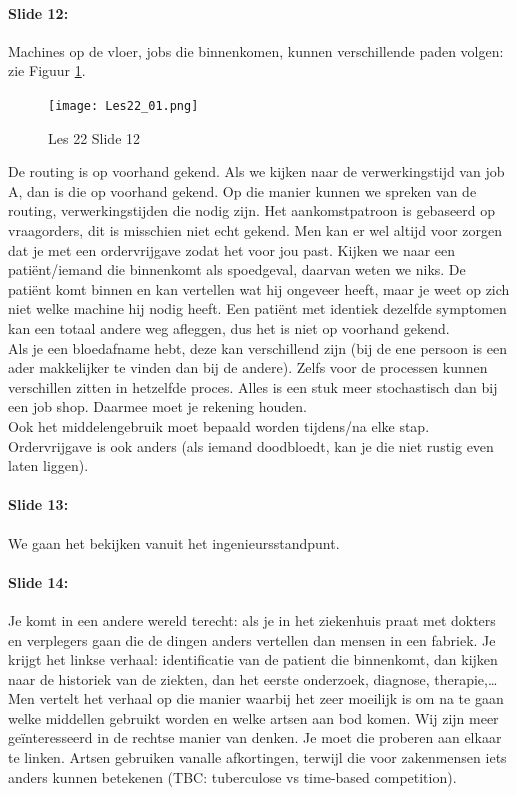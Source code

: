 \documentclass[10pt,a4paper]{report}
\begin{document}
\paragraph{Slide 12:} Machines op de vloer, jobs die binnenkomen, kunnen verschillende paden volgen: zie Figuur \ref{les22_01}.\\

\begin{figure}[h!]
\centering
\texttt{[image: Les22\_01.png]}
\caption{Les 22 Slide 12} 
\label{les22_01}
\end{figure}

De routing is op voorhand gekend. Als we kijken naar de verwerkingstijd van job A, dan is die op voorhand gekend. Op die manier kunnen we spreken van de routing, verwerkingstijden die nodig zijn. Het aankomstpatroon is gebaseerd op vraagorders, dit is misschien niet echt gekend. Men kan er wel altijd voor zorgen dat je met een ordervrijgave zodat het voor jou past. Kijken we naar een pati\"ent/iemand die binnenkomt als spoedgeval, daarvan weten we niks. De pati\"ent komt binnen en kan vertellen wat hij ongeveer heeft, maar je weet op zich niet welke machine hij nodig heeft. Een pati\"ent met identiek dezelfde symptomen kan een totaal andere weg afleggen, dus het is niet op voorhand gekend.\\
Als je een bloedafname hebt, deze kan verschillend zijn (bij de ene persoon is een ader makkelijker te vinden dan bij de andere). Zelfs voor de processen kunnen verschillen zitten in hetzelfde proces. Alles is een stuk meer stochastisch dan bij een job shop. Daarmee moet je rekening houden.\\
Ook het middelengebruik moet bepaald worden tijdens/na elke stap. \\
Ordervrijgave is ook anders (als iemand doodbloedt, kan je die niet rustig even laten liggen).

\paragraph{Slide 13:} We gaan het bekijken vanuit het ingenieursstandpunt.

\paragraph{Slide 14:} Je komt in een andere wereld terecht: als je in het ziekenhuis praat met dokters en verplegers gaan die de dingen anders vertellen dan mensen in een fabriek. Je krijgt het linkse verhaal: identificatie van de patient die binnenkomt, dan kijken naar de historiek van de ziekten, dan het eerste onderzoek, diagnose, therapie,… Men vertelt het verhaal op die manier waarbij het zeer moeilijk is om na te gaan welke middellen gebruikt worden en welke artsen aan bod komen. Wij zijn meer ge\"interesseerd in de rechtse manier van denken. Je moet die proberen aan elkaar te linken. Artsen gebruiken vanalle afkortingen, terwijl die voor zakenmensen iets anders kunnen betekenen (TBC: tuberculose vs time-based competition).
\end{document}
